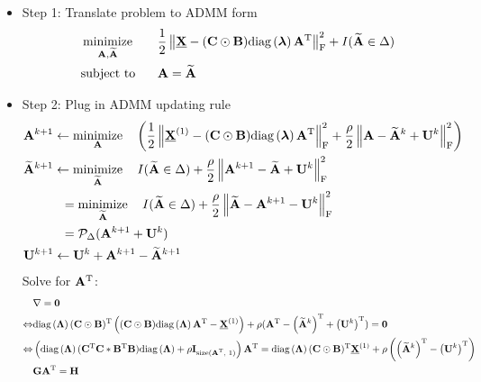 \documentclass[11pt,a4paper]{article}
\newcommand{\norm}[1]{\left\lVert#1\right\rVert}
\newcommand{\diag}[1]{\text{diag}\left(#1\right)}
\DeclareMathOperator*{\minimize}{minimize}
\theoremstyle{plain}
\theoremstyle{definition}
\theoremstyle{remark}
\begin{document}
\begin{itemize}
    \item Step 1: Translate problem to ADMM form
        \begin{alignat*}{2}
            & \minimize_{\mathbf{A}, \widetilde{\mathbf{A}}} \quad && 
            \dfrac{1}{2}\norm{\underline{\mathbf{X}} - (\mathbf{C} \odot \mathbf{B}) \diag{\boldsymbol \lambda} \mathbf{A}^{\rm T} }_{\rm F}^2 + I(\widetilde{\mathbf{A}} \in \Delta) \\
            & \text{subject to} && \mathbf{A} = \widetilde{\mathbf{A}}
        \end{alignat*}
    \item Step 2: Plug in ADMM updating rule
        \begin{align*}
        &\mathbf{A}^{k+1} \leftarrow \minimize_{\mathbf{A}} \quad \left(  \dfrac{1}{2}\norm{\underline{\mathbf{X}}^{(1)} - (\mathbf{C} \odot \mathbf{B}) \diag{\boldsymbol \lambda} \mathbf{A}^{\rm T} }_{\rm F}^2 
        + \dfrac{\rho}{2} \norm{\mathbf{A} - \widetilde{\mathbf{A}}^{k} + \mathbf{U}^{k}}_{\rm F}^2\right) \\
        &\widetilde{\mathbf{A}}^{k+1} \leftarrow 
        \minimize_{\widetilde{\mathbf{A}}} \quad I(\widetilde{\mathbf{A}} \in \Delta) + \dfrac{\rho}{2} \norm{\mathbf{A}^{k+1} - \widetilde{\mathbf{A}} + \mathbf{U}^{k}}_{\rm F}^2 \\
        & \quad \quad \quad = 
        \minimize_{\widetilde{\mathbf{A}}} \quad I(\widetilde{\mathbf{A}} \in \Delta) + \dfrac{\rho}{2} \norm{\widetilde{\mathbf{A}} - \mathbf{A}^{k+1} - \mathbf{U}^{k}}_{\rm F}^2 \\
        & \quad \quad \quad = 
        \mathcal{P}_{\Delta}(\mathbf{A}^{k+1} + \mathbf{U}^{k}) \\
        &\mathbf{U}^{k+1} \leftarrow 
        \mathbf{U}^{k} + \mathbf{A}^{k+1} - \widetilde{\mathbf{A}}^{k+1}
        \end{align*}
        Solve for $\mathbf{A}^{\rm T} $:
        \begin{align*}
       & \nabla = \mathbf{0} \\
       \Leftrightarrow &\diag{\boldsymbol \Lambda} (\mathbf{C} \odot \mathbf{B})^{\rm T} \left( (\mathbf{C} \odot \mathbf{B})\diag{\boldsymbol \Lambda}\mathbf{A}^{\rm T}  - \underline{\mathbf{X}}^{(1)} \right) + \rho (\mathbf{A}^{\rm T}  - \left(  \widetilde{\mathbf{A}}^{k}\right)^{\rm T} + \left(  \mathbf{U}^{k}\right)^{\rm T} ) = \mathbf{0} \\
       \Leftrightarrow  &\left(  \diag{\boldsymbol \Lambda} (\mathbf{C}^{\rm T} \mathbf{C} * \mathbf{B}^{\rm T} \mathbf{B}) \diag{\boldsymbol  \Lambda}  + \rho \mathbf{I}_{\text{size($\mathbf{A}^{\rm T} $, 1)}}\right) \mathbf{A}^{\rm T} 
             = \diag{\boldsymbol \Lambda} (\mathbf{C} \odot \mathbf{B})^{\rm T} \underline{\mathbf{X}}^{(1)} + \rho \left( \left(  \widetilde{\mathbf{A}}^{k}\right)^{\rm T} - \left(  \mathbf{U}^{k}\right)^{\rm T} \right) \\
       &\mathbf{G} \mathbf{A}^{\rm T}  = \mathbf{H}
       \end{align*}
                    
        
        
\end{itemize}
\end{document}
